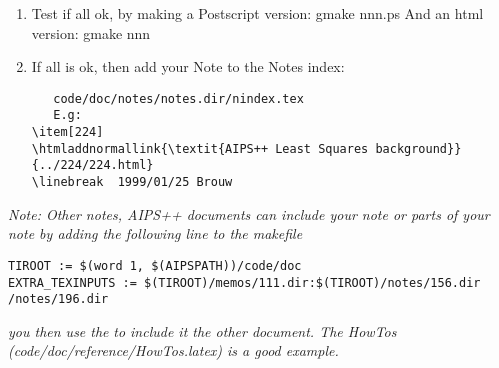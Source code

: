 \begin{enumerate}
\item Test if all ok, by making a Postscript version:
   gmake nnn.ps\newline
   And an html version:\newline
   gmake nnn\newline

\item If all is ok, then add your Note to the Notes index:
\begin{verbatim}
   code/doc/notes/notes.dir/nindex.tex
   E.g:
\item[224]
\htmladdnormallink{\textit{AIPS++ Least Squares background}}{../224/224.html}
\linebreak  1999/01/25 Brouw
\end{verbatim}

\end{enumerate}


\textit{Note: Other notes, AIPS++ documents can include your note or parts of your note
by adding the following line to the makefile}
\begin{verbatim}
TIROOT := $(word 1, $(AIPSPATH))/code/doc
EXTRA_TEXINPUTS := $(TIROOT)/memos/111.dir:$(TIROOT)/notes/156.dir
/notes/196.dir
\end{verbatim}
\textit{you then use the} \verb++
\textit{ to include it the other document.
The HowTos (code/doc/reference/HowTos.latex) is a good example.}
